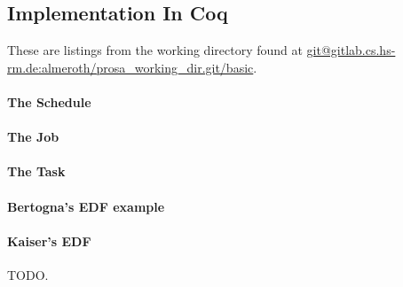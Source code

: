 
\subsection{Implementation In Coq}


These are listings from the working directory found at \url{git@gitlab.cs.hs-rm.de:almeroth/prosa_working_dir.git/basic}.





\paragraph{The Schedule}

\paragraph{The Job}

\paragraph{The Task}

\paragraph{Bertogna's EDF example}

\paragraph{Kaiser's EDF}
TODO.

